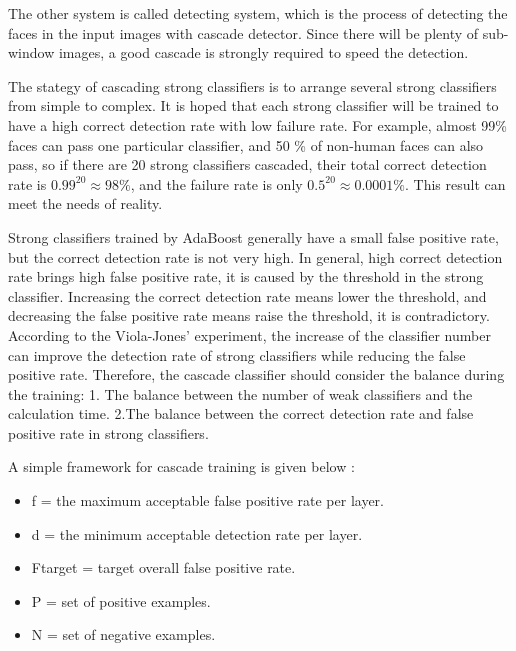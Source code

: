 \documentclass[conference]{IEEEtran}
\begin{document}
The other system is called detecting system, which is the process of detecting the faces in the input images with cascade detector. Since there will be plenty of sub-window images, a good cascade is strongly required to speed the detection.

The stategy of cascading strong classifiers is to arrange several strong classifiers from simple to complex. It is hoped that each strong classifier will be trained to have a high correct detection rate with low failure rate. For example, almost 99\% faces can pass one particular classifier, and 50 \% of non-human faces can also pass, so if there are 20 strong classifiers cascaded, their total correct detection rate is $0.99^{20}\approx98\%$, and the failure rate is only $0.5^{20}\approx0.0001\%$. This result can meet the needs of reality.

Strong classifiers trained by AdaBoost generally have a small false positive rate, but the correct detection rate is not very high. In general, high correct detection rate brings high false positive rate, it is caused by the threshold in the strong classifier. Increasing the correct detection rate means lower the threshold, and decreasing the false positive rate means raise the threshold, it is contradictory. According to the Viola-Jones' experiment, the increase of the classifier number can improve the detection rate of strong classifiers while reducing the false positive rate. Therefore, the cascade classifier should consider the balance during the training: 1. The balance between the number of weak classifiers and the calculation time. 2.The balance between the correct detection rate and false positive rate in strong classifiers.

A simple framework for cascade training is given below \cite{b1}:
\begin{itemize}
  \item f = the maximum acceptable false positive rate per layer.
  \item d = the minimum acceptable detection rate per layer.
  \item Ftarget = target overall false positive rate.
  \item P = set of positive examples.
  \item N = set of negative examples.
\end{itemize}
\end{document}
